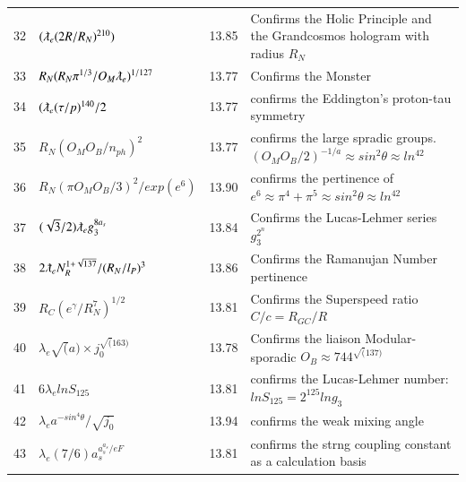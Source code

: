 \documentclass[a4paper,9pt]{article}
\begin{document}
\begin{table}
\begin{tabular}{llll}
    32 & $(\lambdabar_{e} (2R/R_N)^{210})$ & 13.85 & Confirms the Holic Principle and the  Grandcosmos hologram with radius $R_N$  \\
    33 & $R_N(R_N \pi^{1/3}/O_M\lambdabar_{e})^{1/127}$ & 13.77 & Confirms the Monster  \\
    34& $(\lambdabar_{e} (\tau /p)^{140}/2$ & 13.77 & confirms the Eddington's proton-tau symmetry \\
    35& $R_N (O_M O_B/n_{ph})^2$ & 13.77 & confirms the large spradic groups. $(O_M O_B/2)^{-1/a} \approx sin^2\theta \approx ln^42$ \\
    36 & $R_N (\pi O_M O_B/3)^2 / exp(e^6)$ & 13.90 & confirms the pertinence of $e^6 \approx \pi^4 + \pi^5  \approx sin^2\theta \approx ln^42$ \\
    37 & $(\sqrt{3}/2)\lambdabar_{e}g_3^{8a_s}$ & 13.84 & Confirms the Lucas-Lehmer series $g_ 3^{2^n}$\\
    38 & $2\lambdabar_{e} N_R^{1+\sqrt{137}}/(R_N/l_P)^3$ & 13.86 & Confirms the Ramanujan Number pertinence\\
    39 & $R_{C} (e^\gamma/R_N^7)^{1/2}$ & 13.81 & Confirms the Superspeed ratio $C/c = R_{GC}/R$\\
    40 & $\lambda_{e} \sqrt(a) \times j_0 ^{\sqrt(163)}$   & 13.78 & Confirms the  liaison Modular-sporadic $O_B \approx 744^{ \sqrt(137)}$ \\ 
    41 & $ 6\lambda_{e} lnS_{125} $   & 13.81 & confirms the Lucas-Lehmer number: $lnS_{125}  = 2^{125} lng_3 $ \\
    42 & $ \lambda_{e} a^{-sin^4\theta}/\sqrt {j_0}  $   & 13.94 & confirms the weak mixing angle \\
    
    
    43 & $ \lambda_{e} (7/6) a_s^{a_s^{a_s}/eF}  $   & 13.81 & confirms the strng coupling constant as a calculation basis \\

    \bottomrule
  \end{tabular}
\end{table}
\end{document}
